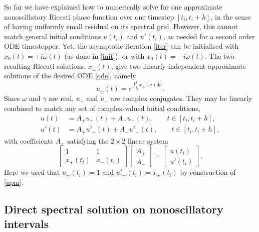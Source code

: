 \documentclass[10pt]{article}
\newcommand{\be}{\begin{equation}}
\newcommand{\ee}{\end{equation}}
\renewcommand{\d}{\mathrm{d}} %
\newcommand{\om}{\omega}
\begin{document}
So far we have explained how to numerically solve for 
one approximate nonoscillatory Riccati phase function over one timestep
$[t_i,t_i+h]$,
in the sense of having uniformly small residual on its spectral grid.
However, this cannot match general initial conditions
$u(t_i)$ and $u'(t_i)$, as needed for a second order ODE timestepper.
Yet, the asymptotic iteration \cref{iter} can be
initialised with $x_0(t) = +i\om(t)$ (as done in \cref{init}), or with $x_0(t)
= -i\om(t)$. The two resulting Riccati solutions, $x_{\pm}(t)$,
give two linearly independent approximate solutions of the desired ODE
\cref{ode}, namely
\be
u_{\pm}(t) = e^{\int_{t_i}^t x_{\pm}(\sigma)\d\sigma}.
\label{upm}
\ee
Since $\om$ and $\gamma$ are real, $u_{+}$ and $u_{-}$ are complex conjugates.
They may be linearly combined to match any set of complex-valued
initial conditions,
\begin{align}
    u(t) &= A_{+}u_{+}(t) + A_{-}u_{-}(t), \qquad t \in [t_i, t_i + h],\\
    u'(t) &= A_{+}u'_{+}(t) + A_{-}u'_{-}(t), \qquad t \in [t_i, t_i + h],
\end{align}
with coefficients $A_\pm$ satisfying the $2\times 2$ linear system
\be
\begin{bmatrix}
    1 & 1 \\
    x_{+}(t_i) & x_{-}(t_i)
\end{bmatrix}
\begin{bmatrix}
    A_{+} \\
    A_{-}
\end{bmatrix}
= 
\begin{bmatrix}
    u(t_i) \\
    u'(t_i)
\end{bmatrix}.
\ee
Here we used that $u_{\pm}(t_i) = 1$ and $u'_{\pm}(t_i) = x_{\pm}(t_i)$ by construction of \cref{upm}.




\subsection{Direct spectral solution on nonoscillatory intervals \label{chebysteps}}
\end{document}
